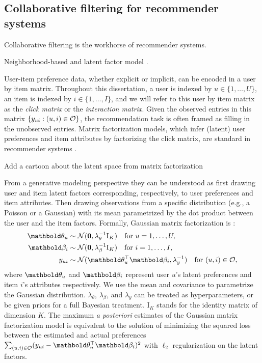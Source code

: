 \subsection{Collaborative filtering for recommender systems} \label{chpt:background:sec:cf}

\PP Collaborative filtering is the workhorse of recommender systems.

\PP Neighborhood-based \citep{sarwar2001item} and latent factor model \citep{koren2009matrix}.

 User-item preference data, whether explicit or implicit, can be encoded in a user by item matrix. Throughout this dissertation, a user is indexed by $u \in \{1, \dots, U\}$, an item is indexed by $i \in \{1, \dots, I\}$, and we will refer to this user by item matrix as the \emph{click matrix} or the \emph{interaction matrix}. Given the observed entries in this matrix $\{y_{ui}: (u, i) \in \mathcal{O}\}$, the recommendation task is often framed as filling in the unobserved entries.  Matrix factorization models, which infer (latent) user preferences and item attributes by factorizing the click matrix, are standard in recommender systems \citep{koren2009matrix}. 

\PP Add a cartoon about the latent space from matrix factorization

From a generative modeling perspective they
can be understood as first drawing user and item latent factors corresponding,
respectively, to user preferences and item attributes. Then drawing 
observations from a specific distribution (e.g., a Poisson
or a Gaussian) with its mean parametrized by the dot product between the user and
the item factors. Formally, Gaussian matrix factorization is \citep{mnih2007probabilistic}: 
\begin{equation} 
\begin{split}
	\mb\theta_{u} &\sim \mathcal{N}(\bzero, \lambda_\theta^{-1} \mathrm{I}_K) \quad \textrm{for } u = 1, \dots, U, \\
	\mb\beta_{i} &\sim \mathcal{N}(\bzero, \lambda_\beta^{-1} \mathrm{I}_K) \quad \textrm{for } i = 1, \dots, I, \\
	y_{ui} &\sim \mathcal{N}(\mb\theta_u^\top \mb\beta_i, \lambda_y^{-1}) \quad \textrm{for } (u, i) \in \cO, 
 \end{split}
 \label{chpt:background:eq:gmf}
 \end{equation}
where $\mb\theta_u$ and $\mb\beta_i$ represent user $u$'s latent preferences and
item $i$'s attributes respectively. We use the mean and covariance to
parametrize the Gaussian distribution. $\lambda_\theta$, $\lambda_\beta$, and
$\lambda_y$ can be treated as hyperparameters, or be given priors for a full Bayesian treatment. $\mathrm{I}_K$ stands for the identity
matrix of dimension $K$. The maximum \emph{a posteriori} estimates of the Gaussian matrix factorization model is equivalent to the solution of minimizing the squared loss between the estimated and actual preferences $\sum_{(u, i)\in \mathcal{O}} (y_{ui} - \mb\theta_u^\top\mb\beta_i)^2$ with $\ell_2$ regularization on the latent factors.

